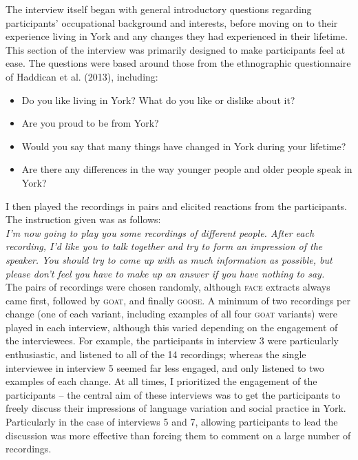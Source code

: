 \documentclass{article}
\begin{document}
The interview itself began with general introductory questions regarding participants' occupational background and interests, before moving on to their experience living in York and any changes they had experienced in their lifetime. This section of the interview was primarily designed to make participants feel at ease. The questions were based around those from the ethnographic questionnaire of Haddican et al. (2013), including:

\begin{itemize}
\item{Do you like living in York? What do you like or dislike about it?}
\item{Are you proud to be from York?}
\item{Would you say that many things have changed in York during your lifetime? }
\item{Are there any differences in the way younger people and older people speak in York?}
\end{itemize}

 I then played the recordings in pairs and elicited reactions from the participants. The instruction given was as follows:\\

 \textit{I'm now going to play you some recordings of different people. After each recording, I'd like you to talk together and try to form an impression of the speaker. You should try to come up with as much information as possible, but please don't feel you have to make up an answer if you have nothing to say.}
 \\

The pairs of recordings were chosen randomly, although \textsc{face} extracts always came first, followed by \textsc{goat}, and finally \textsc{goose}. A minimum of two recordings per change (one of each variant, including examples of all four \textsc{goat} variants) were played in each interview, although this varied depending on the engagement of the interviewees. For example, the participants in interview 3 were particularly enthusiastic, and listened to all of the 14 recordings; whereas the single interviewee in interview 5 seemed far less engaged, and only listened to two examples of each change. At all times, I prioritized the engagement of the participants -- the central aim of these interviews was to get the participants to freely discuss their impressions of language variation and social practice in York. Particularly in the case of interviews 5 and 7, allowing participants to lead the discussion was more effective than forcing them to comment on a large number of recordings. 
\end{document}
